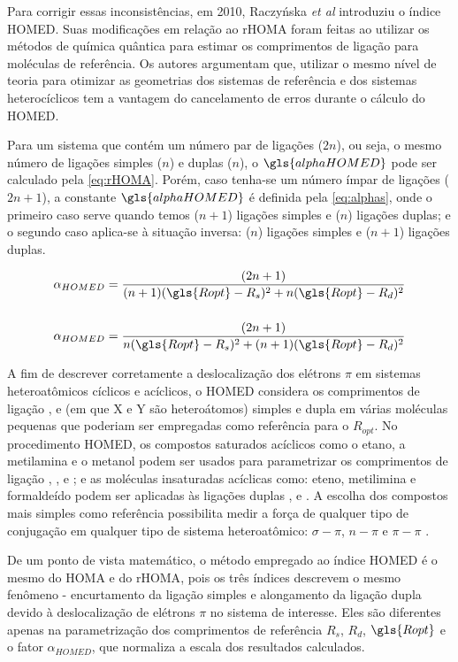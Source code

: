 Para corrigir essas inconsistências, em 2010, Raczyńska \textit{et al}\autocite{Raczyska2010} introduziu o índice \gls{HOMED}. Suas modificações em relação ao \gls{rHOMA} foram feitas ao utilizar os métodos de química quântica para estimar os comprimentos de ligação para moléculas de referência. Os autores argumentam que, utilizar o mesmo nível de teoria para otimizar as geometrias dos sistemas de referência e dos sistemas heterocíclicos tem a vantagem do cancelamento de erros durante o cálculo do \gls{HOMED}.

Para um sistema que contém um número par de ligações ($2n$), ou seja, o mesmo número de ligações simples ($n$) e duplas ($n$), o $\gls{alphaHOMED}$ pode ser calculado pela \autoref{eq:rHOMA}. Porém, caso tenha-se um número ímpar de ligações ($2n + 1$), a constante $\gls{alphaHOMED}$ é definida pela \autoref{eq:alphas}, onde o primeiro caso serve quando temos ($n + 1$) ligações simples e ($n$) ligações duplas; e o segundo caso aplica-se à situação inversa: ($n$) ligações simples e ($n + 1$) ligações duplas.

\begin{equation}
\label{eq:alphas}
    \begin{split}
        \alpha_{HOMED} = \displaystyle \frac{(2n + 1)}{(n+1)(\gls{Ropt} - R_s)^2 + n(\gls{Ropt} - R_d)^2} \\[0.50cm]
        \alpha_{HOMED} = \displaystyle \frac{(2n + 1)}{n(\gls{Ropt} - R_s)^2 + (n + 1)(\gls{Ropt} - R_d)^2}
    \end{split}
\end{equation}

A fim de descrever corretamente a deslocalização dos elétrons $\pi$ em sistemas heteroatômicos cíclicos e acíclicos, o \gls{HOMED} considera os comprimentos de ligação ,  e  (em que X e Y são heteroátomos) simples e dupla em várias moléculas pequenas que
poderiam ser empregadas como referência para o $R_{opt}$. No procedimento \gls{HOMED}, os compostos saturados acíclicos como o etano, a metilamina e o metanol podem ser usados para parametrizar os comprimentos de ligação , , e ; e as moléculas insaturadas acíclicas como: eteno, metilimina e formaldeído podem ser aplicadas às ligações duplas ,  e .  A escolha dos compostos mais simples como referência possibilita
medir a força de qualquer tipo de conjugação em qualquer tipo de sistema heteroatômico: $\sigma-\pi$, $n-\pi$
e $\pi-\pi$ \autocite{Kruszewski1972}.

De um ponto de vista matemático, o método empregado ao índice \gls{HOMED} é o mesmo do \gls{HOMA} e do \gls{rHOMA}, pois os três índices descrevem o mesmo fenômeno - encurtamento da ligação simples e alongamento da ligação dupla devido à deslocalização de elétrons $\pi$ no sistema de interesse. Eles são diferentes apenas na parametrização dos comprimentos de referência $R_s$, $R_d$, $\gls{Ropt}$
e o fator $\alpha_{HOMED}$, que normaliza a escala dos resultados calculados.

